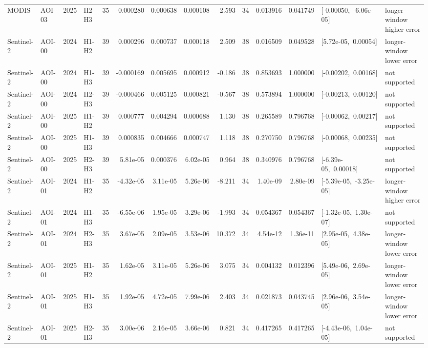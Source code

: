 \begin{longtable}{llclrrrrrrrrp{2.35cm}p{1.75cm}}
MODIS & AOI-03 & 2025 & H2-H3 & 35 & -0.000280 & 0.000638 & 0.000108 & -2.593 & 34 & 0.013916 & 0.041749 & \mbox{[-0.00050, -6.06e-05]} & longer-window higher error \\
Sentinel-2 & AOI-00 & 2024 & H1-H2 & 39 & 0.000296 & 0.000737 & 0.000118 & 2.509 & 38 & 0.016509 & 0.049528 & \mbox{[5.72e-05, 0.00054]} & longer-window lower error \\
Sentinel-2 & AOI-00 & 2024 & H1-H3 & 39 & -0.000169 & 0.005695 & 0.000912 & -0.186 & 38 & 0.853693 & 1.000000 & \mbox{[-0.00202, 0.00168]} & not supported \\
Sentinel-2 & AOI-00 & 2024 & H2-H3 & 39 & -0.000466 & 0.005125 & 0.000821 & -0.567 & 38 & 0.573894 & 1.000000 & \mbox{[-0.00213, 0.00120]} & not supported \\
Sentinel-2 & AOI-00 & 2025 & H1-H2 & 39 & 0.000777 & 0.004294 & 0.000688 & 1.130 & 38 & 0.265589 & 0.796768 & \mbox{[-0.00062, 0.00217]} & not supported \\
Sentinel-2 & AOI-00 & 2025 & H1-H3 & 39 & 0.000835 & 0.004666 & 0.000747 & 1.118 & 38 & 0.270750 & 0.796768 & \mbox{[-0.00068, 0.00235]} & not supported \\
Sentinel-2 & AOI-00 & 2025 & H2-H3 & 39 & 5.81e-05 & 0.000376 & 6.02e-05 & 0.964 & 38 & 0.340976 & 0.796768 & \mbox{[-6.39e-05, 0.00018]} & not supported \\
Sentinel-2 & AOI-01 & 2024 & H1-H2 & 35 & -4.32e-05 & 3.11e-05 & 5.26e-06 & -8.211 & 34 & 1.40e-09 & 2.80e-09 & \mbox{[-5.39e-05, -3.25e-05]} & longer-window higher error \\
Sentinel-2 & AOI-01 & 2024 & H1-H3 & 35 & -6.55e-06 & 1.95e-05 & 3.29e-06 & -1.993 & 34 & 0.054367 & 0.054367 & \mbox{[-1.32e-05, 1.30e-07]} & not supported \\
Sentinel-2 & AOI-01 & 2024 & H2-H3 & 35 & 3.67e-05 & 2.09e-05 & 3.53e-06 & 10.372 & 34 & 4.54e-12 & 1.36e-11 & \mbox{[2.95e-05, 4.38e-05]} & longer-window lower error \\
Sentinel-2 & AOI-01 & 2025 & H1-H2 & 35 & 1.62e-05 & 3.11e-05 & 5.26e-06 & 3.075 & 34 & 0.004132 & 0.012396 & \mbox{[5.49e-06, 2.69e-05]} & longer-window lower error \\
Sentinel-2 & AOI-01 & 2025 & H1-H3 & 35 & 1.92e-05 & 4.72e-05 & 7.99e-06 & 2.403 & 34 & 0.021873 & 0.043745 & \mbox{[2.96e-06, 3.54e-05]} & longer-window lower error \\
Sentinel-2 & AOI-01 & 2025 & H2-H3 & 35 & 3.00e-06 & 2.16e-05 & 3.66e-06 & 0.821 & 34 & 0.417265 & 0.417265 & \mbox{[-4.43e-06, 1.04e-05]} & not supported \\

\end{longtable}
